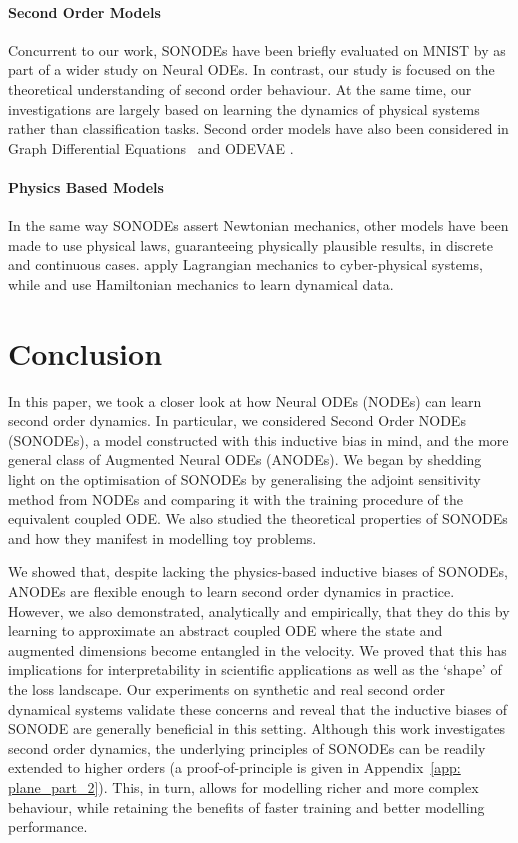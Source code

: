\documentclass{article}
\theoremstyle{remark}
\theoremstyle{definition}
\begin{document}
\paragraph{Second Order Models} Concurrent to our work, SONODEs have been briefly evaluated on MNIST by \citet{massaroli2020dissecting} as part of a wider study on Neural ODEs. In contrast, our study is focused on the theoretical understanding of second order behaviour. At the same time, our investigations are largely based on learning the dynamics of physical systems rather than classification tasks. Second order models have also been considered in Graph Differential Equations~\citep{poli2019graph} and ODEVAE \citep{yldz2019ode2vae}. 

\paragraph{Physics Based Models} In the same way SONODEs assert Newtonian mechanics, other models have been made to use physical laws, guaranteeing physically plausible results, in discrete and continuous cases. \citet{lutter2019deep} apply Lagrangian mechanics to cyber-physical systems, while \citet{greydanus2019hamiltonian} and \citet{zhong2019symplectic} use Hamiltonian mechanics to learn dynamical data. 

\section{Conclusion}

In this paper, we took a closer look at how Neural ODEs (NODEs) can learn second order dynamics. In particular, we considered Second Order NODEs (SONODEs), a model constructed with this inductive bias in mind, and the more general class of Augmented Neural ODEs (ANODEs). We began by shedding light on the optimisation of SONODEs by generalising the adjoint sensitivity method from NODEs and comparing it with the training procedure of the equivalent coupled ODE. We also studied the theoretical properties of SONODEs and how they manifest in modelling toy problems.

We showed that, despite lacking the physics-based inductive biases of SONODEs, ANODEs are flexible enough to learn second order dynamics in practice. However, we also demonstrated, analytically and empirically, that they do this by learning to approximate an abstract coupled ODE where the state and augmented dimensions become entangled in the velocity. We proved that this has implications for interpretability in scientific applications as well as the `shape' of the loss landscape. Our experiments on synthetic and real second order dynamical systems validate these concerns and reveal that the inductive biases of SONODE are generally beneficial in this setting. Although this work investigates second order dynamics, the underlying principles of SONODEs can be readily extended to higher orders (a proof-of-principle is given in Appendix~\ref{app: plane_part_2}). This, in turn, allows for modelling richer and more complex behaviour, while retaining the benefits of faster training and better modelling performance.
\end{document}
